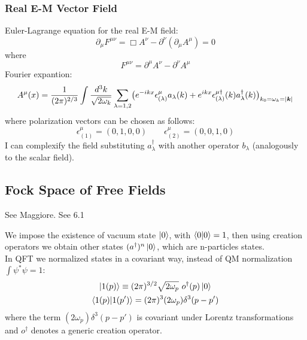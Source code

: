 \documentclass[TheoreticalPhy_ModB.tex]{subfiles}
\begin{document}
\subsubsection{Real E-M Vector Field}
Euler-Lagrange equation for the real E-M field:
\[\partial_{\mu} F^{\mu \nu} = \Box A^{\nu} - \partial^{\nu}(\partial_{\mu} A^{\mu}) = 0\]
where 
\[F^{\mu \nu} = \partial^{\mu} A^{\nu} - \partial^{\nu} A^{\mu}\]
Fourier expantion:
\[
A^{\mu}(x) = \frac{1}{(2 \pi)^{2/3}} \int \frac{d^3 k}{\sqrt{2 \omega_k}} \sum_{\lambda=1,2} \bigl( e^{-ikx} \epsilon_{(\lambda)}^{\mu} a_{\lambda}(k) + e^{ikx} \epsilon_{(\lambda)}^{\mu \dagger}(k) a^{\dagger}_{\lambda}(k) \bigr)_{k_0 = \omega_k = \abs{\vec{k}}}\]
where polarization vectors can be chosen  as follows:
\[
\epsilon_{(1)}^{\mu} = (0, 1, 0, 0) \qquad \epsilon_{(2)}^{\mu} = (0, 0, 1, 0) 
\]
I can complexify the field substituting $a_{\lambda}^{\dagger}$ with another operator $b_{\lambda}$ (analogously to the scalar field).\\


\subsection{Fock Space of Free Fields}
\textsf{See Maggiore. See 6.1}

We impose the existence of vacuum state $\ket{0}$, with $\braket0=1$,  then using creation operators we obtain other states $(a^{\dagger})^n \ket{0}$, which are n-particles states.\\
In QFT we normalized states in a covariant way, instead of QM normalization $\int \psi^* \psi = 1$:%
\begin{subequations}
\begin{gather}
\ket{1(p)} \equiv (2 \pi)^{3/2} \sqrt{2 \omega_p}\ o^{\dagger}(p) \ket{0} \label{eqn:norm-states} \\
\braket{1(p)}{1(p')} = (2 \pi)^3 (2 \omega _p)\delta^3(p - p') \label{eqn:norm-trans} 
\end{gather}
\end{subequations}
where the term $(2 \omega_ p)\delta^3(p - p')$ is covariant under Lorentz transformations and $o^\dagger$ denotes a generic creation operator.
\end{document}
